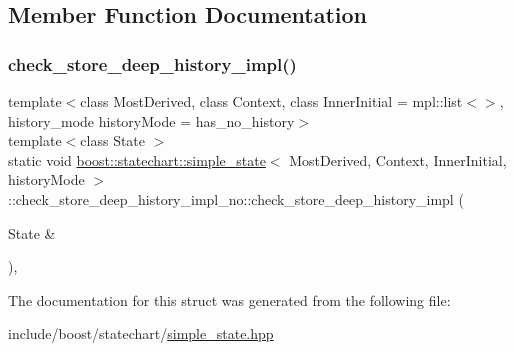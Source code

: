 \subsection{Member Function Documentation}
\mbox{\label{structboost_1_1statechart_1_1simple__state_1_1check__store__deep__history__impl__no_a3163ab74baacc670591fbb5a0f50768c}} 
\subsubsection{\texorpdfstring{check\+\_\+store\+\_\+deep\+\_\+history\+\_\+impl()}{check\_store\_deep\_history\_impl()}}
{\footnotesize\ttfamily template$<$class Most\+Derived, class Context, class Inner\+Initial = mpl\+::list$<$$>$, history\+\_\+mode history\+Mode = has\+\_\+no\+\_\+history$>$ \\
template$<$class State $>$ \\
static void \mbox{\hyperlink{classboost_1_1statechart_1_1simple__state}{boost\+::statechart\+::simple\+\_\+state}}$<$ Most\+Derived, Context, Inner\+Initial, history\+Mode $>$\+::check\+\_\+store\+\_\+deep\+\_\+history\+\_\+impl\+\_\+no\+::check\+\_\+store\+\_\+deep\+\_\+history\+\_\+impl (\begin{DoxyParamCaption}\item[{State \&}]{ }\end{DoxyParamCaption})\hspace{0.3cm}{\ttfamily [inline]}, {\ttfamily [static]}}



The documentation for this struct was generated from the following file\+:\begin{DoxyCompactItemize}
\item 
include/boost/statechart/\mbox{\hyperlink{simple__state_8hpp}{simple\+\_\+state.\+hpp}}\end{DoxyCompactItemize}
